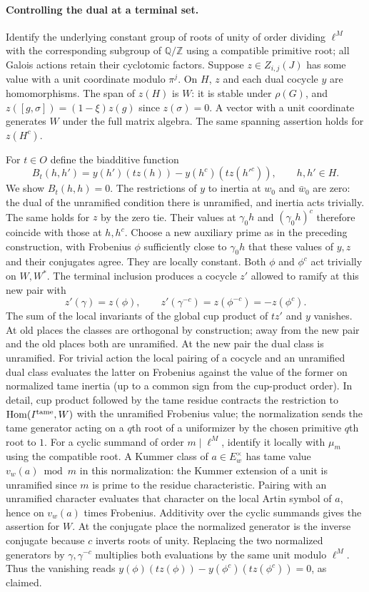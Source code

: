 \paragraph{Controlling the dual at a terminal set.}
Identify the underlying constant group of roots of unity of order dividing
$\ell^M$ with the corresponding subgroup of $\mathbb Q/\mathbb Z$
using a compatible primitive root; all Galois actions retain their
cyclotomic factors. Suppose $z\in Z_{i,j}(J)$ has some value with a unit
coordinate modulo $\pi^j$. On $H$, $z$ and each dual cocycle $y$
are homomorphisms. The span of $z(H)$ is $W$: it is stable under
$\rho(G)$, and $z([g,\sigma])=(1-\xi)z(g)$ since $z(\sigma)=0$.
A vector with a unit coordinate generates $W$ under the full matrix
algebra. The same spanning assertion holds for $z(H^c)$.

For $t\in O$ define the biadditive function
\[
 B_t(h,h')= y(h')(t z(h))-y(h^c)(t z(h'^c)),\qquad h,h'\in H .
\]
We show $B_t(h,h)=0$. The restrictions of $y$ to inertia at $w_0$ and
$\bar w_0$ are zero: the dual of the unramified condition there is
unramified, and inertia acts trivially. The same holds for $z$ by the
zero tie. Their values at $\gamma_0 h$ and $(\gamma_0h)^c$ therefore
coincide with those at $h,h^c$. Choose a new auxiliary prime as in the
preceding construction, with Frobenius $\phi$ sufficiently close to
$\gamma_0h$ that these values of $y,z$ and their conjugates agree.
They are locally constant. Both $\phi$ and $\phi^c$ act trivially
on $W,W^*$. The terminal inclusion produces a cocycle $z'$ allowed to
ramify at this new pair with
\[
 z'(\gamma)=z(\phi),\qquad z'(\gamma^{-c})=z(\phi^{-c})=-z(\phi^c).
\]
The sum of the local invariants of the global cup product of $tz'$ and
$y$ vanishes. At old places the classes are orthogonal by construction;
away from the new pair and the old places both are unramified. At the
new pair the dual class is unramified. For trivial action the local
pairing of a cocycle and an unramified dual class evaluates the latter
on Frobenius against the value of the former on normalized tame inertia
(up to a common sign from the cup-product order). In detail, cup
product followed by the tame residue contracts the restriction to
$\operatorname{Hom}(I^{\rm tame},W)$ with the unramified Frobenius
value; the normalization sends the tame generator acting on a
$q$th root of a uniformizer by the chosen primitive $q$th root to
$1$. For a cyclic summand of order $m\mid\ell^M$, identify it locally with $\mu_m$ using the compatible root. A Kummer class of $a\in E_w^\times$ has tame value $v_w(a)\bmod m$ in this normalization: the Kummer extension of a unit is unramified since $m$ is prime to the residue characteristic. Pairing with an unramified character evaluates that character on the local Artin symbol of $a$, hence on $v_w(a)$ times Frobenius. Additivity over the cyclic summands gives the assertion for $W$. At the conjugate place the normalized generator is the inverse
conjugate because $c$ inverts roots of unity. Replacing the two normalized
generators by $\gamma,\gamma^{-c}$ multiplies both evaluations by the
same unit modulo $\ell^M$. Thus the vanishing reads
$y(\phi)(t z(\phi))-y(\phi^c)(t z(\phi^c))=0$, as claimed.


